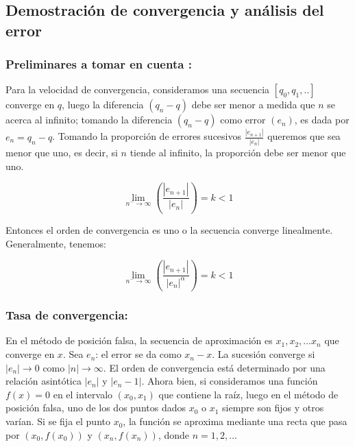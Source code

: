 \subsection{Demostración de convergencia y análisis del error}

\subsubsection{Preliminares a tomar en cuenta \cite{MR_PDF}:}

Para la velocidad de convergencia, consideramos una secuencia $ [q_0,q_1,..] $ converge en $ q $, luego la diferencia $ (q_n - q) $ debe ser menor a medida que $ n $ se acerca al infinito; tomando la diferencia $ (q_n - q) $ como error $ (e_n) $, es dada por $ e_n = q_n - q $.\newline\newline
Tomando la proporción de errores sucesivos $ \frac{|e_{n+1}|}{|e_n|} $ queremos que sea menor que uno, es decir, si $ n $ tiende al infinito, la proporción debe ser menor que uno.

\begin{displaymath}
    \lim_{n^{-} \to \infty} (\frac{|e_{n+1}|}{|e_n|}) = k < 1
\end{displaymath}
	
Entonces el orden de convergencia es uno o la secuencia converge linealmente.\newline
Generalmente, tenemos:

\begin{displaymath}
    \lim_{n^{-} \to \infty} (\frac{|e_{n+1}|}{|e_n|^\alpha}) = k < 1
\end{displaymath}

\subsubsection{Tasa de convergencia:}

En el método de posición falsa, la secuencia de aproximación es $ {x_1,x_2,\ldots x_n} $ que converge en $ x $. Sea $ e_n $: el error se da como $ x_n - x $. La sucesión converge si $ |e_n| \rightarrow 0 $ como $ |n| \rightarrow \infty $. El orden de convergencia está determinado por una relación asintótica $ |e_n| $ y $ |e_n - 1| $. Ahora bien, si consideramos una función $ f(x)=0 $ en el intervalo $ (x_0, x_1) $ que contiene la raíz, luego en el método de posición falsa, uno de los dos puntos dados $ x_0 $ o $ x_1 $ siempre son fijos y otros varían. Si se fija el punto $ x_0 $, la función se aproxima mediante una recta que pasa por $ (x_0, f(x_0)) $ y $ (x_n, f(x_n)) $, donde $ n=1,2,\ldots $


